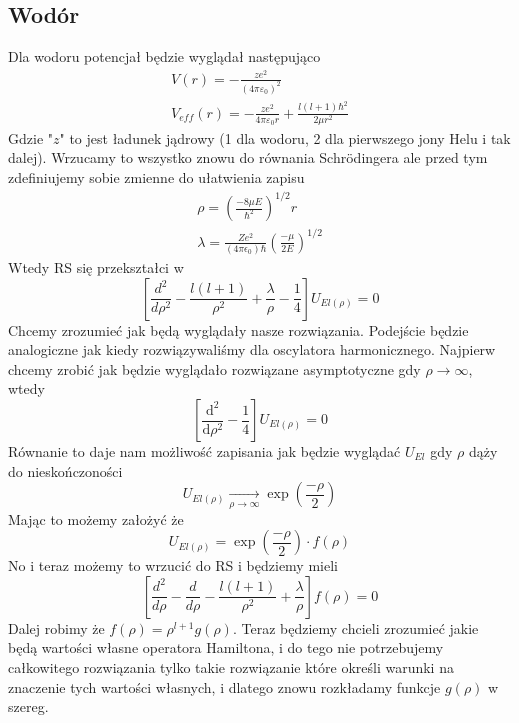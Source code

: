 \subsection{Wodór}
Dla wodoru potencjał będzie wyglądał następująco
\begin{equation*}
	\begin{gathered}
		V(r)=-\frac{z e^{2}}{\left(4 \pi \varepsilon_{0}\right)^2}\\
		V_{eff}(r) = -\frac{z e^2}{4 \pi \varepsilon_0 r} + \frac{l(l+1)\hbar^2}{2\mu r^2}
	\end{gathered}
\end{equation*}
Gdzie "$z$" to jest ładunek jądrowy (1 dla wodoru, 2 dla pierwszego jony Helu i tak dalej). Wrzucamy to wszystko znowu do równania Schrödingera ale przed tym zdefiniujemy sobie zmienne do ułatwienia zapisu
\begin{equation*}
	\begin{gathered}
		\rho=\left(\frac{-8\mu E}{\hbar^2}\right)^{1/2}r\\
		\lambda = \frac{Z e^2}{(4 \pi \epsilon_0) \hbar} \left(\frac{-\mu}{2E}\right)^{1/2}
	\end{gathered}
\end{equation*}
Wtedy RS się przekształci w 
\begin{equation*}
	\left[\frac{d^{2}}{d \rho^{2}}-\frac{l(l+1)}{\rho^{2}}+\frac{\lambda}{\rho}-\frac{1}{4}\right]U_{El(\rho)}=0
\end{equation*}
Chcemy zrozumieć jak będą wyglądały nasze rozwiązania. Podejście będzie analogiczne jak kiedy rozwiązywaliśmy dla oscylatora harmonicznego. Najpierw chcemy zrobić jak będzie wyglądało rozwiązane asymptotyczne gdy $\rho \to \infty$, wtedy 
\begin{equation*}
	\left[\frac{\text{d}^{2}}{\text{d} \rho^{2}}-\frac{1}{4}\right]U_{El(\rho)}=0
\end{equation*}
Równanie to daje nam możliwość zapisania jak będzie wyglądać $U_{El}$ gdy $\rho$ dąży do nieskończoności
\begin{equation*}
	U_{El(\rho)} \xrightarrow[\rho \to \infty]{} \exp(\frac{-\rho}{2})
\end{equation*}
Mając to możemy założyć że
\begin{equation*}
	U_{El(\rho)} = \exp(\frac{-\rho}{2}) \cdot f(\rho)
\end{equation*}
No i teraz możemy to wrzucić do RS i będziemy mieli
$$  \left[\frac{d^{2}}{d \rho}-\frac{d}{d \rho}-\frac{l(l+1)}{\rho^{2}}+\frac{\lambda}{\rho}\right] f(\rho)=0  $$
Dalej robimy że $f(\rho) = \rho^{l+1}g(\rho)$. Teraz będziemy chcieli zrozumieć jakie będą wartości własne operatora Hamiltona, i do tego nie potrzebujemy całkowitego rozwiązania tylko takie rozwiązanie które określi warunki na znaczenie tych wartości własnych, i dlatego znowu rozkładamy funkcje $g(\rho)$ w szereg.
